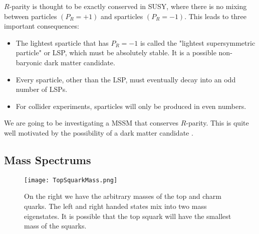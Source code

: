 $R$-parity is thought to be exactly conserved in SUSY, where there is no mixing between particles $(P_R=+1)$ and sparticles $(P_R=-1)$. This leads to three important consequences:
\begin{itemize}
	 \item The lightest sparticle that has $P_R=-1$ is called the "lightest supersymmetric particle" or LSP, which must be absolutely stable. It is a possible non-baryonic dark matter candidate.
	 \item Every sparticle, other than the LSP, must eventually decay into an odd number of LSPs.
	 \item For collider experiments, sparticles will only be produced in even numbers.
\end{itemize}
 We are going to be investigating a MSSM that conserves $R$-parity. This is quite well motivated by the possibility of a dark matter candidate \cite{feng_dark_2010}. 

\subsection{Mass Spectrums}\label{subsec:StopMassSpec}

\begin{figure}
\centering
	\texttt{[image: TopSquarkMass.png]}
 	\caption[Top squark mass hierarchy]{On the right we have the arbitrary masses of the top and charm quarks. The left and right handed states mix into two mass eigenstates. It is possible that the top squark will have the smallest mass of the squarks.}
 	\label{StopMass} 
\end{figure}

